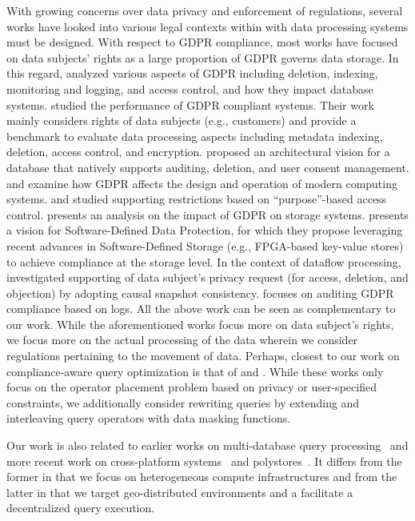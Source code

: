 \documentclass[11pt]{article}
\begin{document}
 With growing concerns over data
privacy and enforcement of regulations, several works have
looked into various legal contexts within with data
processing systems must be designed. With respect to GDPR
compliance, most works have focused on data subjects' rights
as a large proportion of GDPR governs data storage. In this
regard, \cite{Mohan2019} analyzed various aspects of GDPR
including deletion, indexing, monitoring and logging, and
access control, and how they impact database systems.
\cite{GDPRBench, Shastri2020} studied the performance of
GDPR compliant systems. Their work mainly considers rights
of data subjects (e.g., customers) and provide a benchmark
to evaluate data processing aspects including metadata
indexing, deletion, access control, and encryption.
\cite{Kraska2019,Kraska2019SchengenDB} proposed an
architectural vision for a database that natively supports
auditing, deletion, and user consent management.
\cite{shastri2019gdpr} and \cite{Shastri19-hotcloud} examine
how GDPR affects the design and operation of modern
computing systems. \cite{Schwarzkopf2019} and
\cite{wang2019-datacapsule} studied supporting restrictions
based on ``purpose''-based access control. \cite{shah2019}
presents an analysis on the impact of GDPR on storage
systems. \cite{zsolt2021-sdp} presents a vision for
Software-Defined Data Protection, for which they propose
leveraging recent advances in Software-Defined Storage
(e.g., FPGA-based key-value stores) to achieve compliance at
the storage level. In the context of dataflow processing,
\cite{spenger2021} investigated supporting of data subject's
privacy request (for access, deletion, and objection) by
adopting causal snapshot consistency. \cite{arfelt2019}
focuses on auditing GDPR compliance based on logs. All the
above work can be seen as complementary to our work. While
the aforementioned works focus more on data subject's
rights, we focus more on the actual processing of the data
wherein we consider regulations pertaining to the movement
of data. Perhaps, closest to our work on compliance-aware
query optimization is that of \cite{guido2019} and
\cite{Farnan2014,Farnan2013}. While these works only focus
on the operator placement problem based on privacy or
user-specified constraints, we additionally consider
rewriting queries by extending and interleaving query
operators with data masking functions.


 Our work is also
related to earlier works on multi-database query
processing~\cite{1Kossmann2000} and more recent work on
cross-platform systems~\cite{rheem} and
polystores~\cite{bigdawg2015}. It differs from the former in
that we focus on heterogeneous compute infrastructures and
from the latter in that we target geo-distributed
environments and a facilitate a  decentralized query
execution.
\end{document}
